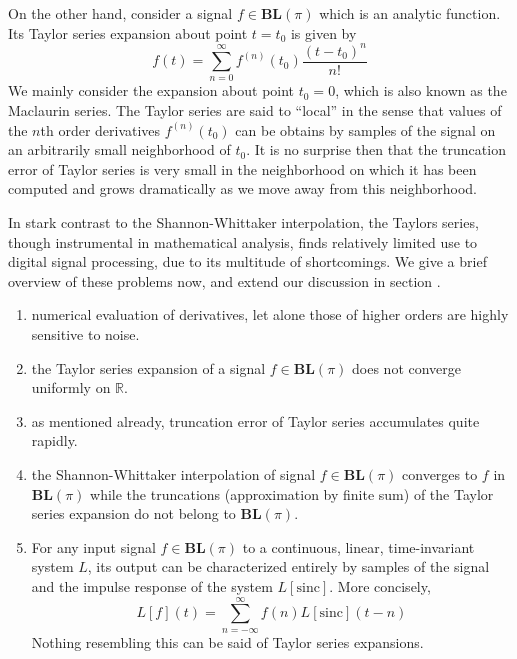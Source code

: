 \documentclass[11pt]{article} %
\theoremstyle{plain}
\theoremstyle{definition}
\theoremstyle{remark}
\begin{document}
On the other hand, consider a signal $f \in \mathbf{BL}(\pi)$ which is an analytic function.
Its Taylor series expansion about point $t=t_0$ is given by
\begin{equation} \label{eq:taylor}
  f(t) = \sum_{n=0}^{\infty} f^{(n)}(t_0) \frac{(t-t_0)^n}{n!}
\end{equation}
We mainly consider the expansion about point $t_0=0$, which is also known as the Maclaurin series.
The Taylor series are said to ``local'' in the sense that values of the $n$th order derivatives 
$f^{(n)}(t_0)$ can be obtains by samples of the signal on an arbitrarily small neighborhood
of $t_0$. It is no surprise then that the truncation error of Taylor series is very small in the 
neighborhood on which it has been computed and grows dramatically as we move away from this neighborhood.

In stark contrast to the Shannon-Whittaker interpolation, the Taylors series, though 
instrumental in mathematical analysis, finds relatively limited use to digital signal 
processing, due to its multitude of shortcomings. We give a brief overview of these problems
now, and extend our discussion in section .

\begin{enumerate}
  \item numerical evaluation of derivatives, let alone those of higher orders are
    highly sensitive to noise.
  \item the Taylor series expansion of a signal $f \in \mathbf{BL}(\pi)$ does not
    converge uniformly on $\mathbb{R}$.
  \item as mentioned already, truncation error of Taylor series accumulates quite rapidly.
  \item the Shannon-Whittaker interpolation of signal $f \in \mathbf{BL}(\pi)$ converges
    to $f$ in $\mathbf{BL}(\pi)$ while the truncations (approximation by finite sum) of the
    Taylor series expansion do not belong to $\mathbf{BL}(\pi)$.
  \item For any input signal $f \in \mathbf{BL}(\pi)$ to a continuous, linear, time-invariant 
    system $L$, its output can be characterized entirely by samples of the signal 
    and the impulse response of the system $L[\mathrm{sinc}]$. More concisely,
    \begin{equation}
      L[f](t) = \sum_{n=-\infty}^{\infty} f(n) L[\mathrm{sinc}](t-n)
    \end{equation}
    Nothing resembling this can be said of Taylor series expansions.
\end{enumerate}
\end{document}
